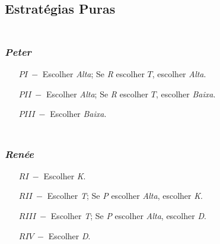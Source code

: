 \subsection{Estratégias Puras}
\begin{frame}
\frametitle{\subsecname\\\emph{Peter}}
\begin{enumerate}
	\item[$ PI\ -$] Escolher \emph{Alta}; Se \emph{R} escolher $T$, escolher \emph{Alta}.
	\item[$ PII\ -$] Escolher \emph{Alta}; Se \emph{R} escolher $T$, escolher \emph{Baixa}.
	\item[$ PIII\ -$] Escolher \emph{Baixa}.
\end{enumerate}
\end{frame}

\begin{frame}
\frametitle{\subsecname\\\emph{Renée}}
\begin{enumerate}
	\item[$ RI\ -$] Escolher \emph{K}.
	\item[$ RII\ -$] Escolher \emph{T}; Se \emph{P} escolher \emph{Alta}, escolher \emph{K}.
	\item[$ RIII\ -$] Escolher \emph{T}; Se \emph{P} escolher \emph{Alta}, escolher \emph{D}.
	\item[$ RIV\ -$] Escolher \emph{D}.
\end{enumerate}
\end{frame}
